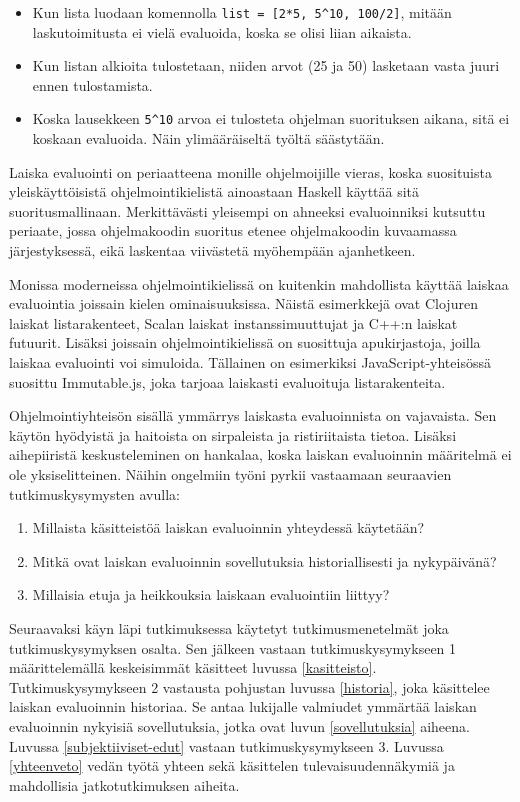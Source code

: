 \begin{itemize}
    \item{Kun lista luodaan komennolla \verb!list = [2*5, 5^10, 100/2]!, mitään laskutoimitusta ei vielä evaluoida, koska se olisi liian aikaista.}
    \item{Kun listan alkioita tulostetaan, niiden arvot (25 ja 50) lasketaan vasta juuri ennen tulostamista.}
    \item{Koska lausekkeen \verb!5^10! arvoa ei tulosteta ohjelman suorituksen aikana, sitä ei koskaan evaluoida. Näin ylimääräiseltä työltä säästytään.}
\end{itemize}

Laiska evaluointi on periaatteena monille ohjelmoijille vieras, koska suosituista yleiskäyttöisistä ohjelmointikielistä ainoastaan Haskell käyttää sitä suoritusmallinaan. Merkittävästi yleisempi on ahneeksi evaluoinniksi kutsuttu periaate, jossa ohjelmakoodin suoritus etenee ohjelmakoodin kuvaamassa järjestyksessä, eikä laskentaa viivästetä myöhempään ajanhetkeen.

Monissa moderneissa ohjelmointikielissä on kuitenkin mahdollista käyttää laiskaa evaluointia joissain kielen ominaisuuksissa. Näistä esimerkkejä ovat Clojuren laiskat listarakenteet, Scalan laiskat instanssimuuttujat ja C++:n laiskat futuurit. Lisäksi joissain ohjelmointikielissä on suosittuja apukirjastoja, joilla laiskaa evaluointi voi simuloida. Tällainen on esimerkiksi JavaScript-yhteisössä suosittu Immutable.js, joka tarjoaa laiskasti evaluoituja listarakenteita.

Ohjelmointiyhteisön sisällä ymmärrys laiskasta evaluoinnista on vajavaista. Sen käytön hyödyistä ja haitoista on sirpaleista ja ristiriitaista tietoa. Lisäksi aihepiiristä keskusteleminen on hankalaa, koska laiskan evaluoinnin määritelmä ei ole yksiselitteinen. Näihin ongelmiin työni pyrkii vastaamaan seuraavien tutkimuskysymysten avulla:

\begin{enumerate}
  \item{Millaista käsitteistöä laiskan evaluoinnin yhteydessä käytetään?}
  \item{Mitkä ovat laiskan evaluoinnin sovellutuksia historiallisesti ja nykypäivänä?}
  \item{Millaisia etuja ja heikkouksia laiskaan evaluointiin liittyy?}
\end{enumerate}

Seuraavaksi käyn läpi tutkimuksessa käytetyt tutkimusmenetelmät joka tutkimuskysymyksen osalta. Sen jälkeen vastaan tutkimuskysymykseen 1 määrittelemällä keskeisimmät käsitteet luvussa \ref{kasitteisto}. Tutkimuskysymykseen 2 vastausta pohjustan luvussa \ref{historia}, joka käsittelee laiskan evaluoinnin historiaa. Se antaa lukijalle valmiudet ymmärtää laiskan evaluoinnin nykyisiä sovellutuksia, jotka ovat luvun \ref{sovellutuksia} aiheena. Luvussa \ref{subjektiiviset-edut} vastaan tutkimuskysymykseen 3. Luvussa \ref{yhteenveto} vedän työtä yhteen sekä käsittelen tulevaisuudennäkymiä ja mahdollisia jatkotutkimuksen aiheita.
